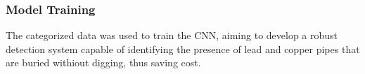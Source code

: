 \subsubsection{Model Training}
The categorized data was used to train the CNN, aiming to develop a robust detection system capable of identifying the presence of lead and copper pipes that are buried withiout digging, thus saving cost.

 

% 				
% 



